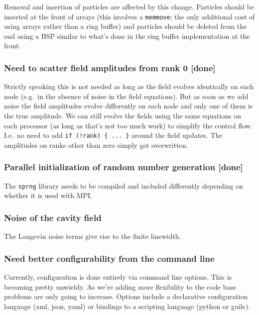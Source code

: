 \documentclass[aps, superscriptaddress, groupedaddress, preprint]{revtex4}
\begin{document}
Removal and insertion of particles are affected by this change.
Particles should be inserted at the front of arrays (this
involves a \verb~memmove~; the only additional cost of using
arrays rather than a ring buffer) and particles should be deleted
from the end using a BSP similar to what's done in the ring
buffer implementation at the front.


\subsubsection{Need to scatter field amplitudes from rank 0 {\bf
[done]}}

Strictly speaking this is not needed as long as the field evolves
identically on each node (e.g.\ in the absence of noise in the
field equations).  But as soon as we add noise the field
amplitudes evolve differently on each node and only one of them
is the true amplitude.  We can still evolve the fields using the
same equations on each processor (as long as that's not too much
work) to simplify the control flow.  I.e.\ no need to add 
\verb~if (!rank) { ... }~ around the field updates.  The
amplitudes on ranks other than zero simply get overwritten.


\subsubsection{Parallel initialization of random number
generation {\bf [done]}}

The \verb~sprng~ library needs to be compiled and included
differently depending on whether it is used with MPI\@.


\subsubsection{Noise of the cavity field}

The Langevin noise terms give rise to the finite linewidth.


\subsubsection{Need better configurability from the command line}

Currently, configuration is done entirely via command line
options.  This is becoming pretty unwieldy.  As we're adding more
flexibility to  the code base problems are only going to
increase.  Options include a declarative configuration language
(xml, json, yaml) or bindings to a scripting language (python or
guile).
\end{document}
